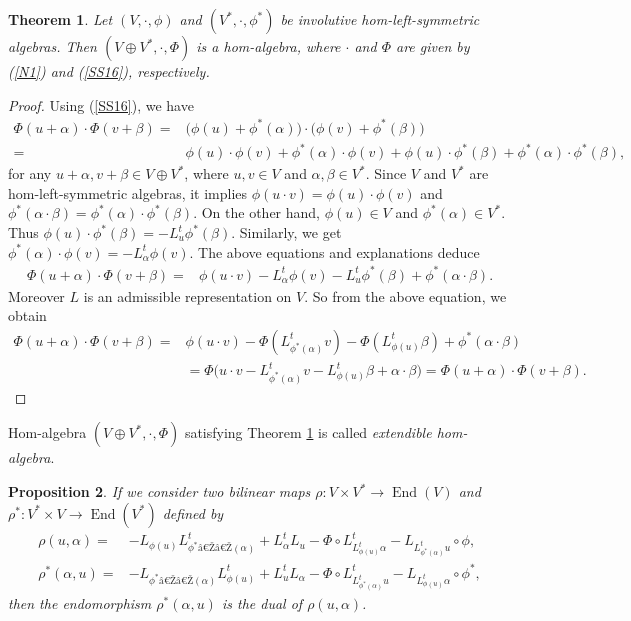 \documentclass[10pt]{amsart}
\numberwithin{equation}{section}
\newtheorem{theorem}{Theorem}[section]
\newtheorem{proposition}[theorem]{Proposition}
\begin{document}
\begin{theorem}\label{AM500}
Let $(V, \cdot, { \phi})$ and $(V^*,\cdot,{ {\phi^*}})$ be involutive hom-left-symmetric algebras. Then
 $(V\oplus V^*,\cdot,\Phi)$ is a hom-algebra, where $\cdot$ and $\Phi$ are given by (\ref{N1}) and (\ref{SS16}), respectively.
\end{theorem}
\begin{proof}
Using (\ref{SS16}), we have
 \begin{align*}
\Phi(u+\alpha)\cdot\Phi(v+\beta)=&\big({ \phi}(u)+{\phi^*}(\alpha)\big)\cdot\big({ \phi}(v)+{\phi^*}(\beta)\big)\\
=&{ { \phi}}(u)\cdot{ { \phi}}(v)+{ {\phi^*}}(\alpha)\cdot{ { \phi}}(v)+{ { \phi}}(u)\cdot{ {\phi^*}}(\beta)+{ {\phi^*}}(\alpha)\cdot{ {\phi^*}}(\beta),
\end{align*}
 for any $u+\alpha, v+\beta\in V\oplus V^*$, where $u,v\in V$ and $\alpha, \beta\in V^*$.
Since $V$ and $V^*$ are  hom-left-symmetric algebras, it implies
$
{ \phi}(u\cdot v)={ \phi}(u)\cdot{ \phi}(v)$ and ${\phi^*}(\alpha\cdot\beta)={\phi^*}(\alpha)\cdot{\phi^*}(\beta).
$
On the other hand, ${ { \phi}}(u)\in V$ and ${ {\phi^*}}(\alpha)\in V^*$. Thus 
$
{ { \phi}}(u)\cdot{ {\phi^*}}(\beta)=-L^t_{u}{ {\phi^*}}(\beta)$. Similarly, we get  
${ {\phi^*}}(\alpha)\cdot{ { \phi}}(v)=-L^t_{\alpha}{ { \phi}}(v)$. 
The above equations and explanations deduce 
 \begin{align*}
\Phi(u+\alpha)\cdot\Phi(v+\beta)
=&{ { \phi}}(u\cdot v)-L^t_{\alpha}{ { \phi}}(v)-L^t_{u}{ {\phi^*}}(\beta)+{ {\phi^*}}(\alpha\cdot\beta).
\end{align*}
Moreover $L$ is an admissible representation on $V$. So from the above equation, we obtain
 \begin{align*}
\Phi(u+\alpha)\cdot\Phi(v+\beta)
=&{ { \phi}}(u\cdot v)-\Phi(L^t_{{ {\phi^*}}(\alpha)}v)-\Phi (L^t_{{ { \phi}}(u)}\beta)+{ {\phi^*}}(\alpha\cdot\beta)\\
&=\Phi\big(u\cdot v-L^t_{{{\phi^*}}(\alpha)}v-L^t_{ { \phi}(u)}\beta+\alpha\cdot\beta\big)=\Phi(u+\alpha)\cdot\Phi(v+\beta).
\end{align*}
\end{proof}
Hom-algebra $(V\oplus V^*,\cdot,\Phi)$ satisfying Theorem \ref{AM500} is called  \textit{extendible hom-algebra}.
\begin{proposition}
If we consider two bilinear maps ${\rho} : V\times V^*\rightarrow \operatorname{End}(V)$ and ${\rho}^* : V^*\times V\rightarrow \operatorname{End}(V^*)$ 
defined by
\begin{align*}
{\rho}(u,\alpha)=&-L_{ { \phi}(u)}L_{ {\phi^*}ââ(\alpha)}^t+L^t_{ \alpha} L_u-{ \Phi}\circ L^t_{L^t_{ { \phi}(u)}\alpha}-L_{L^t_{ {\phi^*}(\alpha)}u}\circ{ \phi},\\
{{\rho}^*}(\alpha,u)=&-L_{ {\phi^*}ââ(\alpha)}L_{ { \phi}(u)}^t+L_{ u}^tL_\alpha-\Phi\circ L^t_{L^t_{ {\phi^*}(\alpha)}u}-L_{L^t_{ { \phi}(u)}\alpha}\circ{ {\phi^*}},
\end{align*}
then the endomorphism ${\rho}^*(\alpha,u)$ is the dual of ${\rho}(u,\alpha)$.
\end{proposition}
\end{document}
